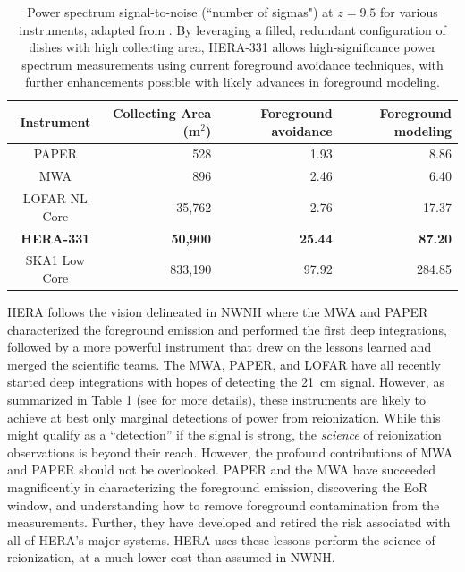\documentclass[preprint]{aastex}
\begin{document}
\begin{table}
\centering
\begin{tabular}{c||r||r|r} 
Instrument & Collecting Area (m$^2$) & Foreground avoidance & Foreground modeling \\
\hline
PAPER & 528 & 1.93 & 8.86 \\
MWA & 896 & 2.46 & 6.40 \\
LOFAR NL Core & 35,762 & 2.76 & 17.37 \\
\textbf{HERA-331} & \textbf{50,900} & \textbf{25.44} & \textbf{87.20} \\
SKA1 Low Core & 833,190 & 97.92 & 284.85 \\
\end{tabular}
\caption{Power spectrum signal-to-noise (``number of sigmas") at $z=9.5$ for various instruments, adapted from \citet{pober_et_al2014}.  By leveraging a filled, redundant configuration of dishes with high collecting area, HERA-331 allows high-significance power spectrum measurements using current foreground avoidance techniques, with further enhancements possible with likely advances in foreground modeling.}
\label{tab:signif}
\end{table}


HERA follows the vision delineated in NWNH where the MWA and PAPER
characterized the foreground emission and performed the first deep
integrations, followed by a more powerful instrument that drew on the lessons
learned and merged the scientific teams. The MWA, PAPER, and LOFAR have all
recently started deep integrations with hopes of detecting the 21~cm
signal.
However, as summarized in Table \ref{tab:signif} (see \citealt{pober_et_al2014} for more details),
these instruments are likely to achieve
at best only marginal detections of power from reionization.
While this might qualify as a ``detection'' if the signal is strong, the
\emph{science} of reionization observations is beyond their reach. 
However, the profound contributions of MWA and PAPER should not be overlooked. PAPER and the MWA have succeeded magnificently in characterizing the foreground emission, discovering the EoR window, and understanding how to remove foreground contamination from the measurements. Further, they have developed and retired the risk associated with all of HERA's major systems. 
HERA uses these lessons perform the science of reionization, at a much lower cost than assumed in NWNH.
\end{document}
